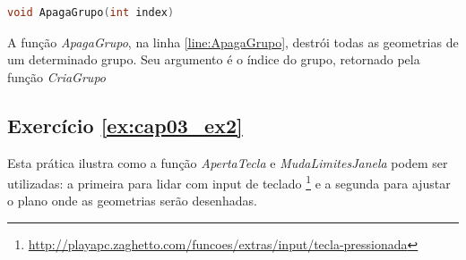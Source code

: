 \begin{lstlisting}[label={func:ApagaGrupo},language=C++]
void ApagaGrupo(int index)
\end{lstlisting}
A função \emph{ApagaGrupo}, na linha \ref{line:ApagaGrupo}, destrói todas as geometrias de um determinado grupo. Seu argumento é o índice do grupo, retornado pela função \emph{CriaGrupo}


\subsection*{Exercício \ref{ex:cap03_ex2} }

Esta prática ilustra como a função \emph{ApertaTecla} e \emph{MudaLimitesJanela} podem ser utilizadas: a primeira para lidar com input de teclado \footnote{\url{http://playapc.zaghetto.com/funcoes/extras/input/tecla-pressionada}} e a segunda para ajustar o plano onde as geometrias serão desenhadas.

